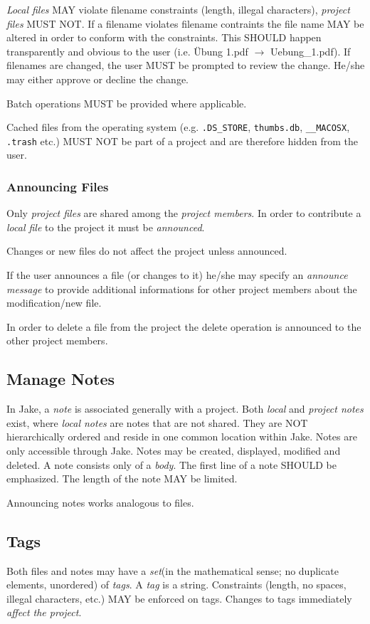 \emph{Local files} MAY violate filename constraints (length, illegal characters), \emph{project files} MUST NOT. If a filename violates filename contraints  the file name MAY be altered in order to conform with the constraints. This SHOULD happen transparently and obvious to the user (i.e. Übung 1.pdf $\rightarrow$ Uebung\_1.pdf). If filenames are changed, the user MUST be prompted to review the change. He/she may either approve or decline the change. 

Batch operations MUST be provided where applicable.

Cached files from the operating system (e.g. \texttt{.DS\_STORE}, \texttt{thumbs.db}, \texttt{\_\_MACOSX}, \texttt{.trash} etc.) MUST NOT be part of a project and are therefore hidden from the user.

\subsubsection{Announcing Files}
Only \emph{project files} are shared among the \emph{project members}. In order to contribute a \emph{local file} to the project it must be \emph{announced}. 

Changes or new files do not affect the project unless announced. 

If the user announces a file (or changes to it) he/she may specify an \emph{announce message} to provide additional informations for other project members about the modification/new file.

In order to delete a file from the project the delete operation is announced to the other project members.

\subsection{Manage Notes}
In Jake, a \emph{note} is associated generally with a project. Both \emph{local} and \emph{project notes} exist, where \emph{local notes} are notes that are not shared. They are NOT hierarchically ordered and reside in one common location within Jake. Notes are only accessible through Jake. Notes may be created, displayed, modified and deleted. 
A note consists only of a \emph{body}. The first line of a note SHOULD be emphasized. The length of the note MAY be limited. 

Announcing notes works analogous to files.

\subsection{Tags}
Both files and notes may have a \emph{set}(in the mathematical sense; no duplicate elements, unordered) of \emph{tags}. A \emph{tag} is a string. Constraints (length, no spaces, illegal characters, etc.) MAY be enforced on tags. Changes to tags immediately \emph{affect the project}.

